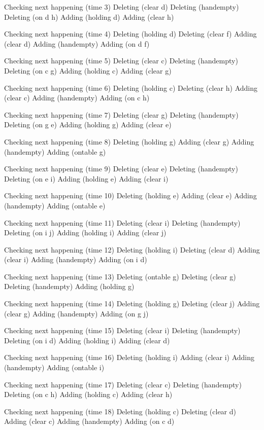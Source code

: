 Checking next happening (time 3)
Deleting (clear d)
Deleting (handempty)
Deleting (on d h)
Adding (holding d)
Adding (clear h)

Checking next happening (time 4)
Deleting (holding d)
Deleting (clear f)
Adding (clear d)
Adding (handempty)
Adding (on d f)

Checking next happening (time 5)
Deleting (clear c)
Deleting (handempty)
Deleting (on c g)
Adding (holding c)
Adding (clear g)

Checking next happening (time 6)
Deleting (holding c)
Deleting (clear h)
Adding (clear c)
Adding (handempty)
Adding (on c h)

Checking next happening (time 7)
Deleting (clear g)
Deleting (handempty)
Deleting (on g e)
Adding (holding g)
Adding (clear e)

Checking next happening (time 8)
Deleting (holding g)
Adding (clear g)
Adding (handempty)
Adding (ontable g)

Checking next happening (time 9)
Deleting (clear e)
Deleting (handempty)
Deleting (on e i)
Adding (holding e)
Adding (clear i)

Checking next happening (time 10)
Deleting (holding e)
Adding (clear e)
Adding (handempty)
Adding (ontable e)

Checking next happening (time 11)
Deleting (clear i)
Deleting (handempty)
Deleting (on i j)
Adding (holding i)
Adding (clear j)

Checking next happening (time 12)
Deleting (holding i)
Deleting (clear d)
Adding (clear i)
Adding (handempty)
Adding (on i d)

Checking next happening (time 13)
Deleting (ontable g)
Deleting (clear g)
Deleting (handempty)
Adding (holding g)

Checking next happening (time 14)
Deleting (holding g)
Deleting (clear j)
Adding (clear g)
Adding (handempty)
Adding (on g j)

Checking next happening (time 15)
Deleting (clear i)
Deleting (handempty)
Deleting (on i d)
Adding (holding i)
Adding (clear d)

Checking next happening (time 16)
Deleting (holding i)
Adding (clear i)
Adding (handempty)
Adding (ontable i)

Checking next happening (time 17)
Deleting (clear c)
Deleting (handempty)
Deleting (on c h)
Adding (holding c)
Adding (clear h)

Checking next happening (time 18)
Deleting (holding c)
Deleting (clear d)
Adding (clear c)
Adding (handempty)
Adding (on c d)

